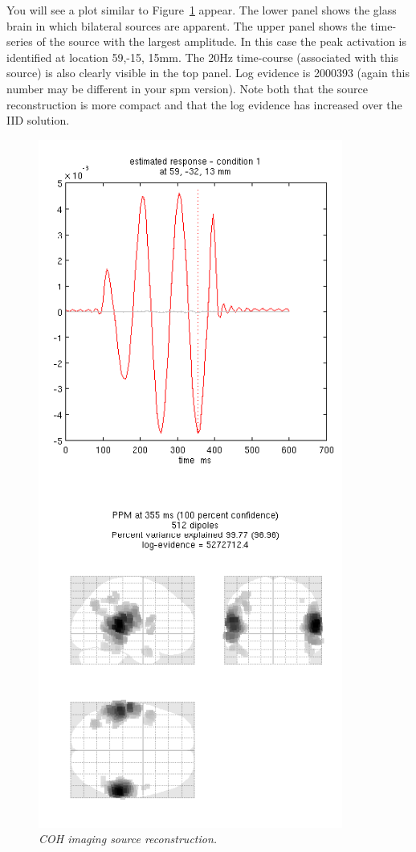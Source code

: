  You will see a plot similar to Figure~\ref{meg_sloc:fig:5} appear. The lower panel shows the glass brain in which bilateral sources are apparent. The upper panel shows the time-series of the source with the largest amplitude. In this case the peak activation is identified at location 59,-15, 15mm. The 20Hz time-course (associated with this source) is also clearly visible in the top panel.  Log evidence is 2000393  (again this number may be different in your spm version). Note both that the source reconstruction is more compact and that the log evidence has increased over the IID solution.

\begin{figure}
\begin{center}
\includegraphics[width=100mm]{meg_sloc/slide5}
\caption{\em COH imaging source reconstruction.\label{meg_sloc:fig:5}}
\end{center}
\end{figure}



